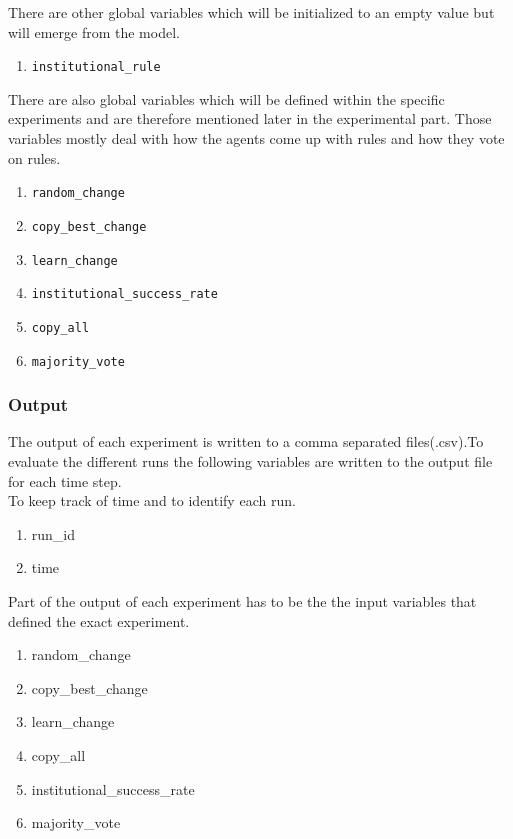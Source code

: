 \documentclass[a4paper]{article}
\begin{document}
There are other global variables which will be initialized to an empty value but will emerge from the model.
\begin{enumerate}
 \item \begin{alltt}institutional_rule\end{alltt}
\end{enumerate}

There are also global variables which will be defined within the specific experiments and are therefore mentioned later in the experimental part. Those variables mostly deal 
with how the agents come up with rules and how they vote on rules. 
\begin{enumerate}
 \item \begin{alltt}random_change\end{alltt}
 \item \begin{alltt}copy_best_change\end{alltt}
 \item \begin{alltt}learn_change\end{alltt}
 \item \begin{alltt}institutional_success_rate\end{alltt}
 \item \begin{alltt}copy_all\end{alltt}
 \item \begin{alltt}majority_vote\end{alltt}
\end{enumerate}

\subsubsection{Output}
The output of each experiment is written to a comma separated files(.csv).To evaluate the different runs the following 
variables are written to the output file for each time step. \\
To keep track of time and to identify each run. 
\begin{enumerate}
 \item run\_id
 \item time
\end{enumerate}

Part of the output of each experiment has to be the the input variables that defined the exact experiment.
\begin{enumerate}
 \item random\_change
 \item copy\_best\_change
 \item learn\_change
 \item copy\_all
 \item institutional\_success\_rate
 \item majority\_vote
\end{enumerate}
\end{document}
